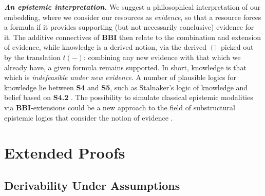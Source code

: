 \documentclass[a4paper]{article}
\newcommand{\BBI}{\textbf{BBI}\xspace}
\newcommand{\SFour}{\textbf{S4}\xspace}
\begin{document}
\textbf{\emph{An epistemic interpretation.}}
We suggest a philosophical interpretation of our embedding, where we consider our resources as \emph{evidence}, so that a resource forces a formula if it provides supporting (but not necessarily conclusive) evidence for it.
The additive connectives of \BBI then relate to the combination and extension of evidence, while knowledge is a derived notion, via the derived $\Box$ picked out by the translation $t(-)$: combining any new evidence with that which we already have, a given formula remains supported. In short, knowledge is that which is \textit{indefeasible under new evidence}. A number of plausible logics for knowledge lie between \SFour and \textbf{S5}, such as Stalnaker's logic of knowledge and belief based on \textbf{S4.2} \cite{articleS42}. The possibility to simulate classical epistemic modalities via \BBI-extensions could be a new approach to the field of substructural epistemic logics that consider the notion of evidence \cite{article_Substructural_Epistemic}.




\appendix

\section{Extended Proofs}
\subsection{Derivability Under Assumptions}
\end{document}
